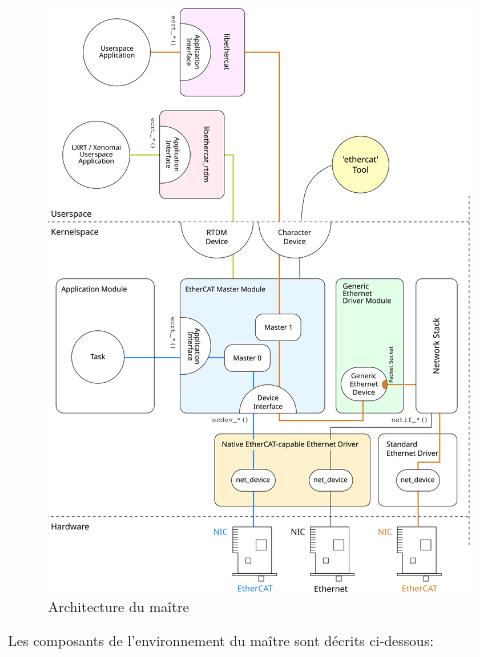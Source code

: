 \documentclass[a4paper,12pt,BCOR=6mm,bibtotoc,idxtotoc]{scrbook}
\begin{document}
\begin{figure}[htbp]
  \centering
  \includegraphics[width=\textwidth]{images/architecture}
  \caption{Architecture du ma\^itre}
  \label{fig:arch}
\end{figure}

Les composants de l'environnement du ma\^itre sont d\'ecrits
ci-dessous:
\end{document}
